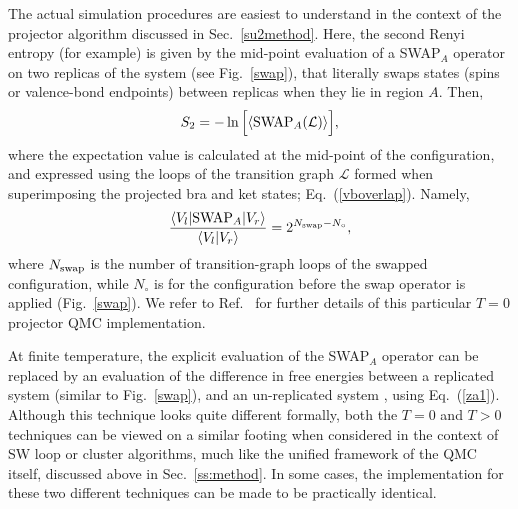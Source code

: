 \documentclass[10pt,pre,aps,twocolumn,showpacs,superscriptaddress,floatfix]{revtex4-1}
\begin{document}
The actual simulation procedures are easiest to understand in the context of the projector algorithm discussed in Sec.~\ref{su2method}.  Here, the second Renyi 
entropy (for example) is given by the  mid-point evaluation of a SWAP$_A$ operator on two replicas of the system (see Fig.~\ref{swap}), that literally swaps states 
(spins or valence-bond endpoints) between replicas when they lie in region $A$.  Then,
\begin{equation}
 S_2 = -\ln \Big[ \langle {\rm SWAP}_A (\mathcal{L})  \rangle \Big],
\end{equation}
where the expectation value is calculated at the mid-point of the configuration, and expressed using the loops of the transition graph  $\mathcal{L}$ formed when 
superimposing the projected bra and ket states; Eq.~(\ref{vboverlap}).  Namely,
\begin{equation}
\frac{\langle V_l| {\rm SWAP}_A | V_r\rangle}{\langle V_l| V_r\rangle} = 2^{N_{\rm swap} - N_\circ } ,
\end{equation} 
where $N_{\rm swap}$ is the number of transition-graph loops of the swapped configuration, while $N_\circ$ is for the configuration before the swap 
operator is applied (Fig.~\ref{swap}). We refer to Ref.~\cite{Kallin11} for further details of this particular $T=0$ projector QMC implementation.  

At finite temperature, the explicit evaluation 
of the SWAP$_A$ operator can be replaced by an evaluation of the difference in free energies between a replicated system (similar to Fig.~\ref{swap}), 
and an un-replicated system \cite{Melko10}, using Eq.~(\ref{za1}).  Although this technique looks quite different formally, both the $T=0$ and $T>0$ techniques 
can be viewed on a similar footing when considered in the context of SW loop or cluster algorithms, much like the unified framework of the QMC itself, discussed
above in Sec.~\ref{ss:method}. In some cases, the implementation for these two different techniques can be made to be practically identical.  
\end{document}

